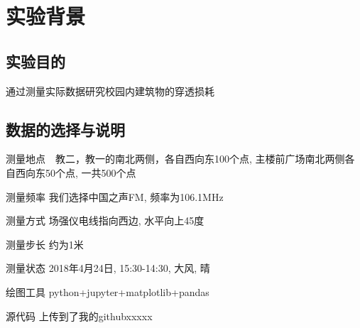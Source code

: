 
\section{实验背景}
	\subsection{实验目的}
		通过测量实际数据研究校园内建筑物的穿透损耗
	\subsection{数据的选择与说明}
		\begin{description}
		  \item{测量地点}　教二，教一的南北两侧，各自西向东100个点, 主楼前广场南北两侧各自西向东50个点, 一共500个点
		  \item{测量频率} 我们选择中国之声FM, 频率为106.1MHz
		  \item{测量方式} 场强仪电线指向西边, 水平向上45度
		  \item{测量步长} 约为1米
		  \item{测量状态} 2018年4月24日, 15:30-14:30, 大风, 晴
		  \item{绘图工具} python+jupyter+matplotlib+pandas
		  \item{源代码} 上传到了我的githubxxxxx
		\end{description}
	

